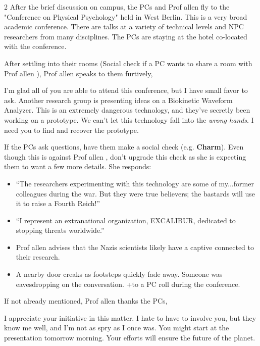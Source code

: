 \documentclass{book}
\newcommand{\df}{\DifficultyDie }
\newcommand{\stb}{\SetbackDie }
\newcommand{\prof}{
    {\color{brown} Prof allen}
}
\begin{document}
\begin{multicols*}{2}
After the brief discussion on campus, the PCs and \prof fly to the "Conference on Physical Psychology" held in West Berlin.  This is a very broad academic conference.  There are talks at a variety of technical levels and NPC researchers from many disciplines.  The PCs are staying at the hotel co-located with the conference.

After settling into their rooms (\df\df Social check if a PC wants to share a room with \prof), \prof speaks to them furtively,

\begin{quoting}
    I'm glad all of you are able to attend this conference, but I have small favor to ask.  Another research group is presenting ideas on a Biokinetic Waveform Analyzer.  This is an extremely dangerous technology, and they've secretly been working on a prototype.  We can't let this technology fall into the \emph{wrong hands}.  I need you to find and recover the prototype.
\end{quoting}

If the PCs ask questions, have them make a \df\df social check (e.g. \textbf{Charm}).  Even though this is against \prof, don't upgrade this check as she is expecting them to want a few more details.  She responds:

\begin{itemize}
    \item \Success ``The researchers experimenting with this technology are some of my...former colleagues during the war.  But they were true believers; the bastards will use it to raise a Fourth Reich!''
    \item \Advantage ``I represent an extranational organization, EXCALIBUR, dedicated to stopping threats worldwide.''
    \item \Triumph \prof advises that the Nazis scientists likely have a captive connected to their research.
    \item \Threat\Threat {}A nearby door creaks as footsteps quickly fade away.  Someone was eavesdropping on the conversation.  +\stb {}to a PC roll during the conference.
\end{itemize}

If not already mentioned, \prof thanks the PCs,

\vspace{-1em}
\begin{quoting}
    I appreciate your initiative in this matter.  I hate to have to involve you, but they know me well, and I'm not as spry as I once was.  You might start at the presentation tomorrow morning.  Your efforts will ensure the future of the planet.
\end{quoting}


\end{multicols*}
\end{document}
